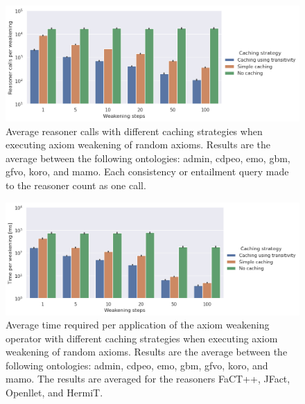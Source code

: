 \begin{figure}[ht]
    \begin{widepage}
      \centering
      \includegraphics[width=\textwidth]{resources/calls-cache-bar.png}
    \end{widepage}
    \caption{Average reasoner calls with different caching strategies when executing axiom weakening of random axioms. Results are the average between the following ontologies: admin, cdpeo, emo, gbm, gfvo, koro, and mamo. Each consistency or entailment query made to the reasoner count as one call.}
\end{figure}

\begin{figure}[ht]
    \begin{widepage}
      \centering
      \includegraphics[width=\textwidth]{resources/time-cache-bar.png}
    \end{widepage}
    \caption{Average time required per application of the axiom weakening operator with different caching strategies when executing axiom weakening of random axioms. Results are the average between the following ontologies: admin, cdpeo, emo, gbm, gfvo, koro, and mamo. The results are averaged for the reasoners FaCT++, JFact, Openllet, and HermiT.}
\end{figure}

